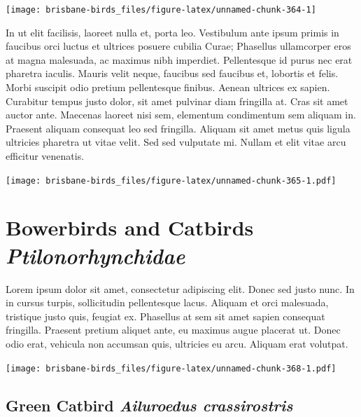 \documentclass[]{book}
\let\origfigure\figure
\let\endorigfigure\endfigure
\renewenvironment{figure}[1][2] {
  \expandafter\origfigure\expandafter[H]
} {
  \endorigfigure
}
\begin{document}
\begin{figure}
\texttt{[image: brisbane-birds\_files/figure-latex/unnamed-chunk-364-1]} \caption{insert figure caption}\label{fig:unnamed-chunk-364}
\end{figure}

In ut elit facilisis, laoreet nulla et, porta leo. Vestibulum ante ipsum
primis in faucibus orci luctus et ultrices posuere cubilia Curae;
Phasellus ullamcorper eros at magna malesuada, ac maximus nibh
imperdiet. Pellentesque id purus nec erat pharetra iaculis. Mauris velit
neque, faucibus sed faucibus et, lobortis et felis. Morbi suscipit odio
pretium pellentesque finibus. Aenean ultrices ex sapien. Curabitur
tempus justo dolor, sit amet pulvinar diam fringilla at. Cras sit amet
auctor ante. Maecenas laoreet nisi sem, elementum condimentum sem
aliquam in. Praesent aliquam consequat leo sed fringilla. Aliquam sit
amet metus quis ligula ultricies pharetra ut vitae velit. Sed sed
vulputate mi. Nullam et elit vitae arcu efficitur venenatis.

\begin{figure}
\centering
\texttt{[image: brisbane-birds\_files/figure-latex/unnamed-chunk-365-1.pdf]}
\caption{\label{fig:unnamed-chunk-365}insert figure caption}
\end{figure}

\chapter{\texorpdfstring{Bowerbirds and Catbirds
\emph{Ptilonorhynchidae}}{Bowerbirds and Catbirds Ptilonorhynchidae}}\label{bowerbirds-and-catbirds-ptilonorhynchidae}

Lorem ipsum dolor sit amet, consectetur adipiscing elit. Donec sed justo
nunc. In in cursus turpis, sollicitudin pellentesque lacus. Aliquam et
orci malesuada, tristique justo quis, feugiat ex. Phasellus at sem sit
amet sapien consequat fringilla. Praesent pretium aliquet ante, eu
maximus augue placerat ut. Donec odio erat, vehicula non accumsan quis,
ultricies eu arcu. Aliquam erat volutpat.

\texttt{[image: brisbane-birds\_files/figure-latex/unnamed-chunk-368-1.pdf]}

\section{\texorpdfstring{Green Catbird \emph{Ailuroedus
crassirostris}}{Green Catbird Ailuroedus crassirostris}}\label{green-catbird-ailuroedus-crassirostris}
\end{document}
